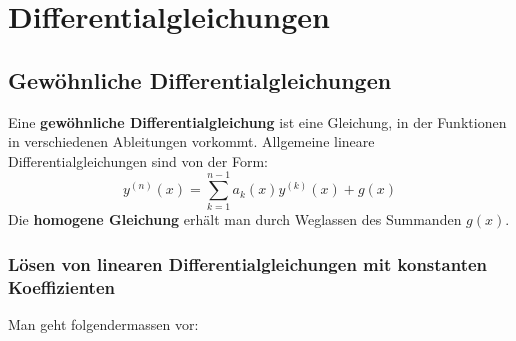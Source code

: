 \documentclass[a4paper,10pt]{scrartcl}
\begin{document}
\section{Differentialgleichungen}
\subsection{Gewöhnliche Differentialgleichungen}
Eine \textbf{gewöhnliche Differentialgleichung} ist eine Gleichung, in der Funktionen in verschiedenen Ableitungen vorkommt. Allgemeine lineare Differentialgleichungen sind von der Form: 
\begin{equation}
y^{(n)}(x)=\sum _{k=1}^{n-1}a_{k}(x)y^{(k)}(x)+g(x)
\end{equation}
Die \textbf{homogene Gleichung} erhält man durch Weglassen des Summanden $g(x)$. 
\subsubsection{Lösen von linearen Differentialgleichungen mit konstanten Koeffizienten}
Man geht folgendermassen vor: 
\end{document}
